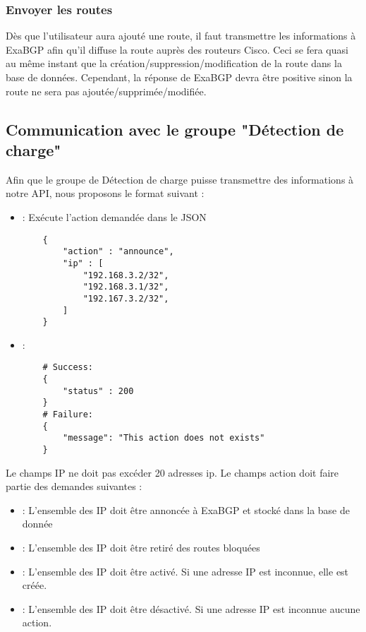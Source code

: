 \subsubsection{Envoyer les routes}
Dès que l'utilisateur aura ajouté une route, il faut transmettre les informations à ExaBGP afin qu'il diffuse la route auprès des routeurs Cisco. Ceci se fera quasi au même instant que la création/suppression/modification de la route dans la base de données. Cependant, la réponse de ExaBGP devra être positive sinon la route ne sera pas ajoutée/supprimée/modifiée.

\subsection{Communication avec le groupe "Détection de charge"}
Afin que le groupe de Détection de charge puisse transmettre des informations à notre API, nous proposons le format suivant :

\begin{itemize}

    \item [\textbf{POST /api/detection}] : Exécute l'action demandée dans le JSON
    \begin{verbatim}
    {
        "action" : "announce",
        "ip" : [
            "192.168.3.2/32",
            "192.168.3.1/32",
            "192.167.3.2/32",
        ]
    }
    \end{verbatim}
    \item [\textbf{Réponse à l'action exécutée}] :

    \begin{verbatim}
    # Success:
    {
        "status" : 200
    }
    # Failure:
    {
        "message": "This action does not exists"
    }
    \end{verbatim}

\end{itemize}

Le champs IP ne doit pas excéder 20 adresses ip.
Le champs action doit faire partie des demandes suivantes :

\begin{itemize}
    \item[\textbf{announce}] : L'ensemble des IP doit être annoncée à ExaBGP et stocké dans la base de donnée
    \item[\textbf{withdraw}] : L'ensemble des IP doit être retiré des routes bloquées
    \item[\textbf{activate}] : L'ensemble des IP doit être activé. Si une adresse IP est inconnue, elle est créée.
    \item[\textbf{deactivate}] : L'ensemble des IP doit être désactivé. Si une adresse IP est inconnue aucune action.
\end{itemize}

